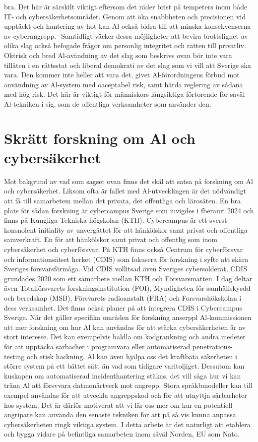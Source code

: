 {bra. Det här är särskilt viktigt eftersom det räder brist på tempeters inom både IT- och cybersäkerhetsområdet. Genom att öka snabbheten och precisionen vid upptäckt och hantering av hot kan Al också bidra till att minska konsekvenserna av cyberangrepp. \({ }^{}\)
Samtidligt väcker dessa möjligheter att bevira brottslighet av olika slag också befogade frågor om personlig integritet och rätten till privatliv. Oktrisk och bred Al-avändning av det slag som beskrivs ovan bör inte vara tillåten i en rättsstat och liberal demokrati av det slag som vi vill att Sverige ska vara. Den kommer inte heller att vara det, givet Al-förordningens förbud mot användning av Al-system med oaceptabel risk, samt härda reglering av sådana med hög risk. Det här är viktigt för människors långsiktiga förtorende för såväl Al-tekniken i sig, som de offentliga verksamheter som använder den. \({ }^{}\)
\section*{Skrätt forskning om Al och cybersäkerhet}
Mot bakgrund av vad som sagset ovan finns det skäl att satsa på forskning om Al och cybersäkerhet. Liksom ofta är fallet med Al-utvecklingen är det nödvändigt att få till samarbetem mellan det privata, det offentliga och lärosäten. En bra plats för sådan forskning är cybercampus Sverige som invigdes i fberauri 2024 och finns på Kungliga Tekniska högskolan (KTH). Cybercampus är ett sverst konsnolent initiality av unvergåttet för att hänkölskor samt privat och offentliga samverkraft. En för att hänkölskor samt privat och offentlig som inom cybersäkerhet och cyberförsvar. På KTH finns också Centrum för cyberförsvar och informationsätset herket (CDIS) som fokusera för forskning i syfte att skära Sveriges försvarsförmåga. Vid CDIS vollitsad även Sveriges cybersolderat, CDIS grundades 2020 som ett samarbete mellan KTH och Försvarsmatten. I dag deltar även Totalförsvarets forskningsinstitution (FOI), Myndigheten för samhällskysdd och beredskap (MSB), Försvarets radioanstalt (FRA) och Forsvarshökskolan i dess verksamhet. Det finns också planer på att integrera CDIS i Cybercampus Sverige.
När det gäller specifika områden för forskning anserppl Al-kommissionen att mer forskning om hur Al kan användas för att stärka cybersäkerheten är av stort interesse. Det kan exempelvis haldla om kodgrankning och andra medeter för att upptäcka särbacher i programvara eller automatiserad penetrations-
testing och etisk hackning. Al kan även hjälpa oss det kraftbäta säkerheten i större system på ett bättet sätt än vad som tidigare varitoljiget. Dessutom kan kuskapen om automatiserad incidenthantering stäkas, det vill såga hur vi kan träna Al att försvvara datmonärtverk mot angrepp. Stora språkbmodeller kan
till exempel användas för att utveckla angreppskod och för att utnyttja sårbarheter hos system. Det är därför motiverat att vi lär oss mer om hur en potentiell angripare kan använda den senaste tekniken för att på så vis kunna anpassa cybersäkerheten ringk viktiga system. I detta arbete är det naturligt att etablera och bygga vidare på befintliga samarbeten inom såväl Norden, EU som Nato.
}
